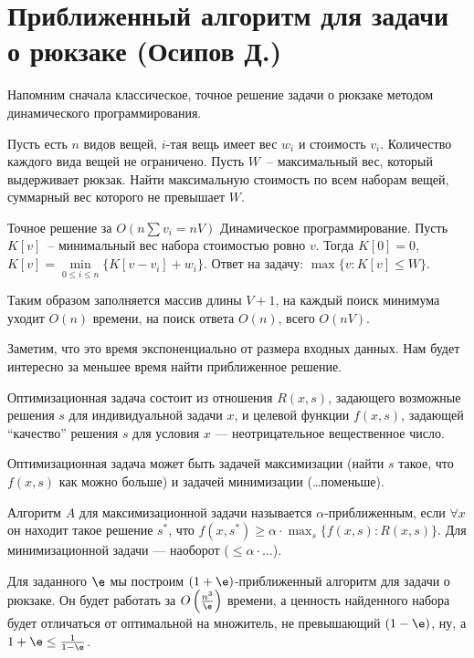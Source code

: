 \section{Приближенный алгоритм для задачи о рюкзаке (Осипов Д.)}
Напомним сначала классическое, точное решение задачи о рюкзаке методом динамического программирования.

\begin{problem*}
	Пусть есть $n$ видов вещей, $i$-тая вещь имеет вес $w_i$ и стоимость $v_i$. Количество каждого вида вещей не ограничено. Пусть $W$~-- максимальный вес, который выдерживает рюкзак. Найти максимальную стоимость по всем наборам вещей, суммарный вес которого не превышает $W$.
\end{problem*}

\begin{algodescription}{Точное решение за $O\left(n\sum{v_i}=nV\right)$} Динамическое программирование. Пусть $K[v]$~-- минимальный вес набора стоимостью ровно $v$. Тогда $K[0] = 0$, $K[v] = \min\limits_{0\le i\le n}\{K[v-v_i] + w_i\}$. Ответ на задачу: $\max\{v : K[v] \leq W\}$.

Таким образом заполняется массив длины $V+1$, на каждый поиск минимума уходит $O(n)$ времени, на поиск ответа $O(n)$, всего $O(nV)$.
\end{algodescription}

Заметим, что это время экспоненциально от размера входных данных.
Нам будет интересно за меньшее время найти приближенное решение.
\begin{definition*}
Оптимизационная задача состоит из отношения $R(x,s)$, задающего возможные решения $s$ для индивидуальной задачи $x$,
и целевой функции $f(x,s)$, задающей ``качество'' решения $s$ для условия $x$ --- неотрицательное вещественное число.

Оптимизационная задача может быть задачей максимизации (найти $s$ такое, что $f(x,s)$ как можно больше)
и задачей минимизации (\ldots поменьше).

Алгоритм $A$ для максимизационной задачи называется $\alpha$-приближенным,
если $\forall x$ он находит такое решение $s^*$, что $f(x,s^*)\ge \alpha\cdot \max_s \{f(x,s)\colon R(x,s)\}$.
Для минимизационной задачи --- наоборот ($\le \alpha \cdot \ldots$).
\end{definition*}

Для заданного $\e$ мы построим $(1+\e)$-приближенный алгоритм для задачи о рюкзаке.
Он будет работать за $O\left(\frac{n^3}{\e}\right)$ времени, а ценность найденного набора будет отличаться от оптимальной на множитель, не превышающий $(1-\e)$,
ну, а $1+\e \le \frac1{1-\e}$.

